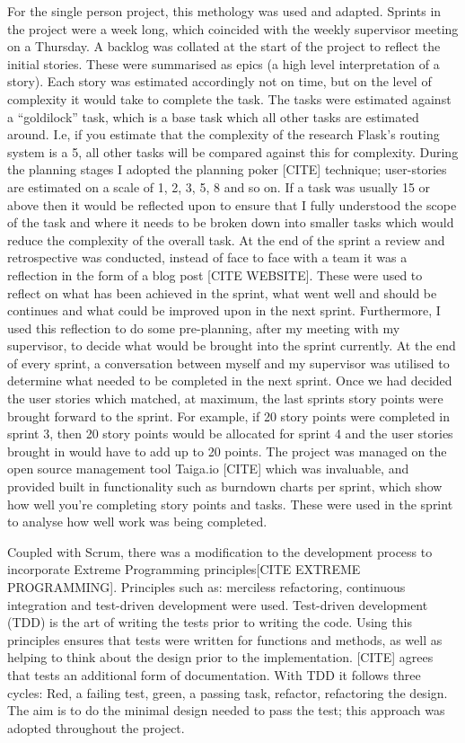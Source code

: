 For the single person project, this methology was used and adapted. Sprints in the project were a week long, which coincided with the weekly supervisor meeting on a Thursday.  A backlog was collated at the start of the project to reflect the initial stories. These were summarised as epics (a high level interpretation of a story). Each story was estimated accordingly not on time, but on the level of complexity it would take to complete the task. The tasks were estimated against a ``goldilock'' task, which is a base task which all other tasks are estimated around. I.e, if you estimate that the complexity of the research Flask's routing system is a 5, all other tasks will be compared against this for complexity. During the planning stages I adopted the planning poker [CITE] technique; user-stories are estimated on a scale of 1, 2, 3, 5, 8 and so on. If a task was usually 15 or above then it would be reflected upon to ensure that I fully understood the scope of the task and where it needs to be broken down into smaller tasks which would reduce the complexity of the overall task.  At the end of the sprint a review and retrospective was conducted, instead of face to face with a team it was a reflection in the form of a blog post [CITE WEBSITE]. These were used to reflect on what has been achieved in the sprint, what went well and should be continues and what could be improved upon in the next sprint.  Furthermore, I used this reflection to do some pre-planning, after my meeting with my supervisor, to decide what would be brought into the sprint currently. At the end of every sprint, a conversation between myself and my supervisor was utilised to determine what needed to be completed in the next sprint. Once we had decided the user stories which matched, at maximum, the last sprints story points were brought forward to the sprint. For example, if 20 story points were completed in sprint 3, then 20 story points would be allocated for sprint 4 and the user stories brought in would have to add up to 20 points. The project was managed on the open source management tool Taiga.io [CITE] which was invaluable, and provided built in functionality such as burndown charts per sprint, which show how well you're completing story points and tasks. These were used in the sprint to analyse how well work was being completed.

Coupled with Scrum, there was a modification to the development process to incorporate Extreme Programming principles[CITE EXTREME PROGRAMMING]. Principles such as: merciless refactoring, continuous integration and test-driven development were used.  Test-driven development (TDD) is the art of writing the tests prior to writing the code. Using this principles ensures that tests were written for functions and methods, as well as helping to think about the design prior to the implementation. [CITE] agrees that tests an additional form of documentation. With TDD it follows three cycles: Red, a failing test, green, a passing task, refactor, refactoring the design. The aim is to do the minimal design needed to pass the test; this approach was adopted throughout the project. 

